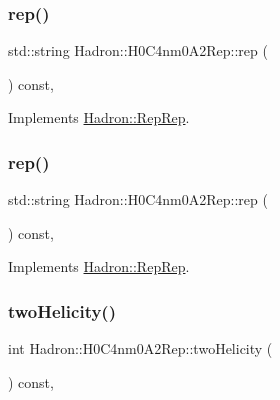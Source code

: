 \subsubsection{\texorpdfstring{rep()}{rep()}\hspace{0.1cm}{\footnotesize\ttfamily [4/5]}}
{\footnotesize\ttfamily std\+::string Hadron\+::\+H0\+C4nm0\+A2\+Rep\+::rep (\begin{DoxyParamCaption}{ }\end{DoxyParamCaption}) const\hspace{0.3cm}{\ttfamily [inline]}, {\ttfamily [virtual]}}



Implements \mbox{\hyperlink{structHadron_1_1RepRep_ab3213025f6de249f7095892109575fde}{Hadron\+::\+Rep\+Rep}}.

\mbox{\label{structHadron_1_1H0C4nm0A2Rep_a82046f2360bc0682e6b0f7ce6b03286c}} 
\subsubsection{\texorpdfstring{rep()}{rep()}\hspace{0.1cm}{\footnotesize\ttfamily [5/5]}}
{\footnotesize\ttfamily std\+::string Hadron\+::\+H0\+C4nm0\+A2\+Rep\+::rep (\begin{DoxyParamCaption}{ }\end{DoxyParamCaption}) const\hspace{0.3cm}{\ttfamily [inline]}, {\ttfamily [virtual]}}



Implements \mbox{\hyperlink{structHadron_1_1RepRep_ab3213025f6de249f7095892109575fde}{Hadron\+::\+Rep\+Rep}}.

\mbox{\label{structHadron_1_1H0C4nm0A2Rep_a9c95fc4b1759a69a69dd2406a3e0a36b}} 
\subsubsection{\texorpdfstring{twoHelicity()}{twoHelicity()}\hspace{0.1cm}{\footnotesize\ttfamily [1/3]}}
{\footnotesize\ttfamily int Hadron\+::\+H0\+C4nm0\+A2\+Rep\+::two\+Helicity (\begin{DoxyParamCaption}{ }\end{DoxyParamCaption}) const\hspace{0.3cm}{\ttfamily [inline]}, {\ttfamily [virtual]}}

